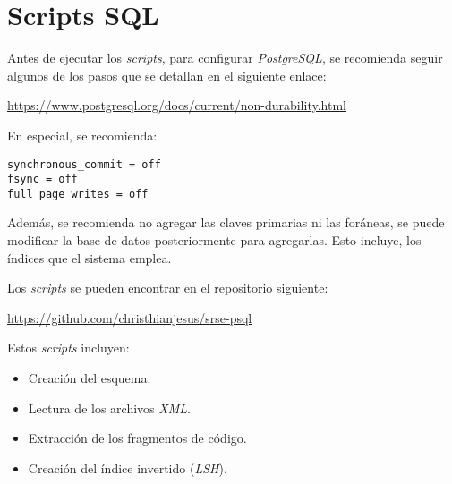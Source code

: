 \chapter{Scripts SQL}
\label{ape:sql}

Antes de ejecutar los \textit{scripts}, para configurar \textit{PostgreSQL},
se recomienda seguir algunos de los pasos que se detallan en el siguiente enlace:

\url{https://www.postgresql.org/docs/current/non-durability.html}

En especial, se recomienda:

\begin{lstlisting}[caption={Configuración PostgreSQL.}]
synchronous_commit = off
fsync = off
full_page_writes = off
\end{lstlisting}

Además, se recomienda no agregar las claves primarias ni las foráneas,
se puede modificar la base de datos posteriormente para agregarlas.
Esto incluye, los índices que el sistema emplea.

Los \textit{scripts} se pueden encontrar en el repositorio siguiente:

\url{https://github.com/christhianjesus/srse-psql}

Estos \textit{scripts} incluyen:

\begin{itemize}
  \item Creación del esquema.
  \item Lectura de los archivos \textit{XML}.
  \item Extracción de los fragmentos de código.
  \item Creación del índice invertido (\textit{LSH}).
\end{itemize}